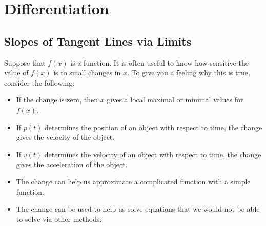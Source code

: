 \chapter{Differentiation}


\section{Slopes of Tangent Lines via Limits}

Suppose that $f(x)$ is a function.  It is often useful to know how
sensitive the value of $f(x)$ is to small changes in $x$. To give you
a feeling why this is true, consider the following:
\begin{itemize}
\item If the change is zero, then $x$ gives a local maximal or minimal
  values for $f(x)$.
\item If $p(t)$ determines the position of an object with respect to
  time, the change gives the velocity of the object.
\item If $v(t)$ determines the velocity of an object with respect to
  time, the change gives the acceleration of the object.
\item The change can help us approximate a complicated function with a
  simple function.
\item The change can be used to help us solve equations that we would
  not be able to solve via other methods.
\end{itemize}

